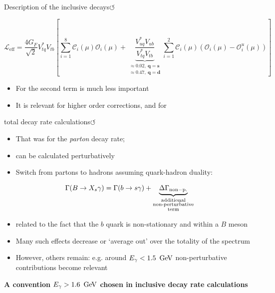 \documentclass[xcolor=dvipsnames]{beamer}
\begin{document}
\begin{frame}{Description of the inclusive decays\hyperlink{frame:A}{$\circlearrowleft$}}
   \scriptsize

   \begin{equation}\nonumber
      \mathcal{L}_{\mathrm{eff}} = \frac{4G_F}{\sqrt{2}}V_{tq}^*V_{tb}\left[\sum^{8}_{i=1}\mathcal{C}_i(\mu)\mathcal{O}_i(\mu)
                                                  + {\underbrace{\frac{V^*_{uq}V_{ub}}{V^*_{tq}V_{tb}}}_{\substack{\approx 0.02,~\mathbf{q = s}\\\approx 0.47,~\mathbf{q = d}}}}\sum^{2}_{i=1}\mathcal{C}_i(\mu)(\mathcal{O}_i(\mu)-\mathcal{O}_i^u(\mu))\right]
   \end{equation}

\begin{itemize}
   \item For \btosgamma the second term is much less important
   \item It is relevant for higher order corrections, and for \btodgamma
\end{itemize}

\end{frame}


\begin{frame}{\safeBtoXsgamma total decay rate calculations\hyperlink{frame:A}{$\circlearrowleft$}}
\scriptsize
   \begin{itemize}
      \item That was for the \textit{parton} decay rate;
      \item[\ra] can be calculated perturbatively 
      \item Switch from partons to hadrons assuming quark-hadron duality:
   \end{itemize}

   \vspace{10pt}

   \begin{equation}\nonumber
      \Gamma(B\rightarrow X_s\gamma) = \Gamma(b\rightarrow s\gamma) + \underbrace{\Delta\Gamma_{\mathrm{non-p.}}}_{\substack{\text{additional}\\\text{non-perturbative}\\\text{term}}}
  \end{equation}
  \begin{itemize}
   \item[\ra] related to the fact that the $b$ quark is non-stationary and within a $B$ meson
   \item Many such effects decrease or `average out' over the totality of the spectrum
   \item However, others remain: e.g. around ${E_{\gamma}}<1.5~\mathrm{\,Ge\kern -0.1em V}$ non-perturbative \ccbar contributions become relevant 
     \end{itemize}

     \textbf{A convention ${E_{\gamma}}>1.6~\mathrm{\,Ge\kern -0.1em V}$ chosen in inclusive decay rate calculations}

\end{frame}
\end{document}

